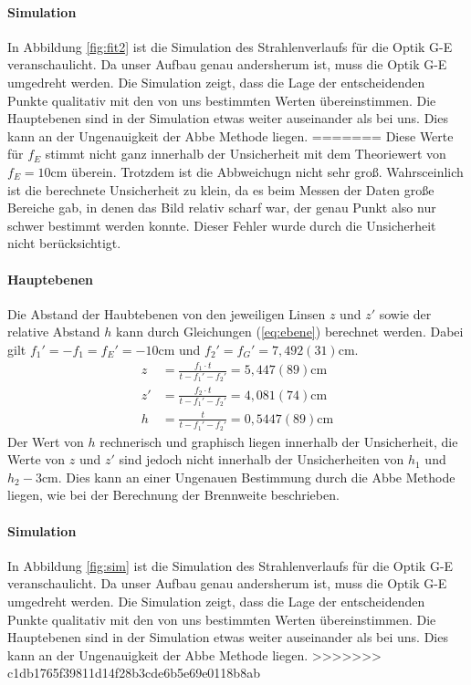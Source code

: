 \documentclass[11pt, a4paper]{article}
\begin{document}
    \paragraph{Simulation}
    In Abbildung \ref{fig:fit2} ist die Simulation des Strahlenverlaufs für die Optik G-E veranschaulicht. Da unser Aufbau genau andersherum ist, muss die Optik G-E umgedreht werden. Die Simulation zeigt, dass die Lage der entscheidenden Punkte qualitativ mit den von uns bestimmten Werten übereinstimmen. Die Hauptebenen sind in der Simulation etwas weiter auseinander als bei uns. Dies kann an der Ungenauigkeit der Abbe Methode liegen.
=======
    Diese Werte für $f_E$ stimmt nicht ganz innerhalb der Unsicherheit mit dem Theoriewert von $f_E = 10 \si{\centi\metre}$ überein. Trotzdem ist die Abbweichugn nicht sehr groß. Wahrsceinlich ist die berechnete Unsicherheit zu klein, da es beim Messen der Daten große Bereiche gab, in denen das Bild relativ scharf war, der genau Punkt also nur schwer bestimmt werden konnte. Dieser Fehler wurde durch die Unsicherheit nicht berücksichtigt.

    \paragraph{Hauptebenen}
    Die Abstand der Haubtebenen von den jeweiligen Linsen $z$ und $z'$ sowie der relative Abstand $h$ kann durch Gleichungen (\ref{eq:ebene}) berechnet werden. Dabei gilt $f_1' = -f_1 = f_E' = -10 \si{\centi\metre}$ und $f_2' = f_G' = 7,492(31) \si{\centi\metre}$.
    \begin{align}
        z &= \frac{f_1 \cdot t}{t - f_1' - f_2'} = 5,447(89) \si{\centi\metre} \\
        z' &= \frac{f_2 \cdot t}{t - f_1' - f_2'} = 4,081(74) \si{\centi\metre} \\
        h &= \frac{t}{t - f_1' - f_2'} = 0,5447(89) \si{\centi\metre}
    \end{align}
    Der Wert von $h$ rechnerisch und graphisch liegen innerhalb der Unsicherheit, die Werte von $z$ und $z'$ sind jedoch nicht innerhalb der Unsicherheiten von $h_1$ und $h_2 - 3 \si{\centi\metre}$. Dies kann an einer Ungenauen Bestimmung durch die Abbe Methode liegen, wie bei der Berechnung der Brennweite beschrieben.

    \paragraph{Simulation}
    In Abbildung \ref{fig:sim} ist die Simulation des Strahlenverlaufs für die Optik G-E veranschaulicht. Da unser Aufbau genau andersherum ist, muss die Optik G-E umgedreht werden. Die Simulation zeigt, dass die Lage der entscheidenden Punkte qualitativ mit den von uns bestimmten Werten übereinstimmen. Die Hauptebenen sind in der Simulation etwas weiter auseinander als bei uns. Dies kann an der Ungenauigkeit der Abbe Methode liegen.
>>>>>>> c1db1765f39811d14f28b3cde6b5e69e0118b8ab
\end{document}
